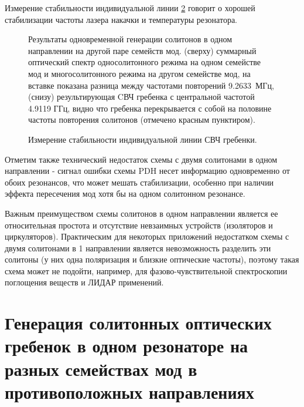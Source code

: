 Измерение стабильности индивидуальной линии \ref{single_line_stability_cp} говорит о хорошей стабилизации частоты лазера накачки и температуры резонатора.

\begin{figure}[!htb]
\begin{minipage}{1\linewidth}
\end{minipage}
\caption{Результаты одновременной генерации солитонов в одном направлении на другой паре семейств мод. (сверху) суммарный оптический спектр односолитонного режима на одном семействе мод и многосолитонного режима на другом семействе мод, на вставке показана разница между частотами повторений 9.2633~МГц, (снизу) результирующая CВЧ гребенка с центральной частотой 4.9119 ГГц, видно что гребенка перекрывается с собой на половине частоты повторения солитонов (отмечено красным пунктиром).}
\label{coscheme_different_types}
\end{figure}

\begin{figure}[!htb]
\begin{minipage}{1\linewidth}
\end{minipage}
\caption{Измерение стабильности индивидуальной линии СВЧ гребенки.}
\label{single_line_stability_cp}
\end{figure}

Отметим также технический недостаток схемы с двумя солитонами в одном направлении - сигнал ошибки схемы PDH несет информацию одновременно от обоих резонансов, что может мешать стабилизации, особенно при наличии эффекта пересечения мод хотя бы на одном солитонном резонансе.

Важным преимуществом схемы солитонов в одном направлении является ее относительная простота и отсутствие невзаимных устройств (изоляторов и циркуляторов). Практическим для некоторых приложений недостатком схемы с двумя солитонами в 1 направлении является невозможность разделить эти солитоны (у них одна поляризация и близкие оптические частоты), поэтому такая схема может не подойти, например, для фазово-чувствительной спектроскопии поглощения веществ и ЛИДАР применений.

\section{Генерация солитонных оптических гребенок в одном резонаторе на разных семействах мод в противоположных направлениях}

